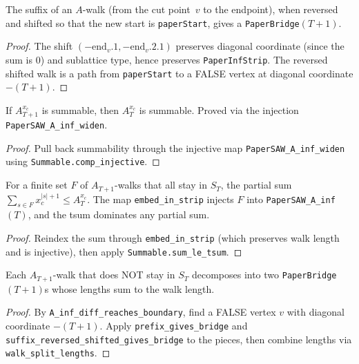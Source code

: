 \begin{lemma}\label{lem:suffix_bridge}
\leanok
{}
  The suffix of an $A$-walk (from the cut point~$v$ to the endpoint),
  when reversed and shifted so that the new start is \texttt{paperStart},
  gives a \texttt{PaperBridge}$(T{+}1)$.
\end{lemma}
\begin{proof}
\leanok
{}
  The shift $(-\mathrm{end}_v.1, -\mathrm{end}_v.2.1)$ preserves diagonal
  coordinate (since the sum is 0) and sublattice type, hence preserves
  \texttt{PaperInfStrip}. The reversed shifted walk is a path from
  \texttt{paperStart} to a FALSE vertex at diagonal coordinate $-(T{+}1)$.
\end{proof}

\begin{lemma}\label{lem:A_inf_summable_succ}
\leanok
{}
  If $A_{T+1}^{x_c}$ is summable, then $A_T^{x_c}$ is summable.
  Proved via the injection \texttt{PaperSAW\_A\_inf\_widen}.
\end{lemma}
\begin{proof}
\leanok
{}
  Pull back summability through the injective map \texttt{PaperSAW\_A\_inf\_widen}
  using \texttt{Summable.comp\_injective}.
\end{proof}

\begin{lemma}\label{lem:in_strip_sum_le}
\leanok
{}
  For a finite set $F$ of $A_{T+1}$-walks that all stay in $S_T$, the partial
  sum $\sum_{s \in F} x_c^{|s|+1} \leq A_T^{x_c}$.
  The map \texttt{embed\_in\_strip} injects $F$ into \texttt{PaperSAW\_A\_inf}$(T)$,
  and the tsum dominates any partial sum.
\end{lemma}
\begin{proof}
\leanok
{}
  Reindex the sum through \texttt{embed\_in\_strip} (which preserves walk length
  and is injective), then apply \texttt{Summable.sum\_le\_tsum}.
\end{proof}

\begin{lemma}\label{lem:extra_walk_decomp}
\leanok
{}
  Each $A_{T+1}$-walk that does NOT stay in $S_T$ decomposes into two
  \texttt{PaperBridge}$(T{+}1)$s whose lengths sum to the walk length.
\end{lemma}
\begin{proof}
\leanok
{}
  By \texttt{A\_inf\_diff\_reaches\_boundary}, find a FALSE vertex $v$ with
  diagonal coordinate $-(T{+}1)$. Apply \texttt{prefix\_gives\_bridge} and
  \texttt{suffix\_reversed\_shifted\_gives\_bridge} to the pieces, then
  combine lengths via \texttt{walk\_split\_lengths}.
\end{proof}

